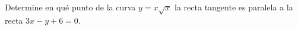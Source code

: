 \item Determine en qué punto de la curva $y = x\sqrt{x}$ la recta tangente es paralela a la recta $3x - y + 6 = 0$.

